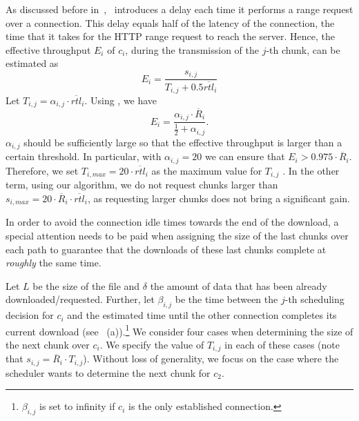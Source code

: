 As discussed before in~, \mhttp~introduces a delay each time it performs a range 
request over a connection. This delay equals half of the latency of the connection, \ie the 
time that it takes for the HTTP range request to reach the server. Hence, the 
effective throughput $E_i$ of $c_i$, during the transmission of the $j$-th chunk, can be 
estimated as 
$$E_i = \frac{s_{i,j}}{T_{i,j} + 0.5 \overline{rtl}_i}$$
Let $T_{i,j} = \alpha_{i,j} \cdot \overline{rtl}_i$. Using , we have
$$E_i=\frac{\alpha_{i,j} \cdot \overline{R}_i}{\frac{1}{2} + \alpha_{i,j}}.$$ 
$\alpha_{i,j}$ should be sufficiently large so that the effective throughput is larger than a certain 
threshold. In particular, with $\alpha_{i,j}=20$ we can ensure that $E_i > 0.975 \cdot \overline{R}_i$. 
Therefore, we set $T_{i,max}=20 \cdot \overline{rtl}_{i}$ as the maximum value for $T_{i,j}$ . 
In the other term, using our algorithm, we do not request chunks larger than 
$s_{i,max}=20 \cdot \overline{R}_i \cdot \overline{rtl}_{i}$, as requesting larger chunks does not bring
a significant gain. 

In order to avoid the connection idle times towards the end of the download, a special attention needs to be paid when assigning the size of the last chunks over each path to guarantee that the downloads of these last chunks complete at {\it roughly} the same time. 

Let $L$ be the size of the file and $\delta$ the amount of data that has been already 
downloaded/requested. Further, let $\beta_{i,j}$ be the time between the $j$-th scheduling 
decision for $c_i$ and the estimated time until the other connection completes its current 
download (see~ (a)).\footnote{$\beta_{i,j}$ is set to infinity if $c_i$ is the only 
established connection.} 
We consider four cases when determining the size of the next chunk 
over $c_i$. We specify the value of $T_{i,j}$ in each of these cases (note that $s_{i,j} = \overline{R}_i \cdot T_{i,j}$). 
Without loss of generality, we focus on the case where the scheduler wants to determine the next chunk for $c_2$. 

